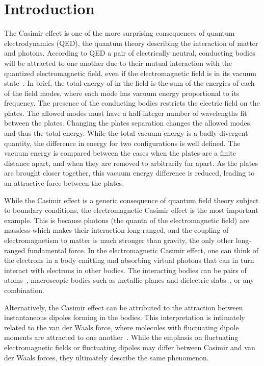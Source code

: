 \chapter{Introduction}
\label{ch:introduction}

The Casimir effect is one of the more surprising consequences of quantum electrodynamics (QED), the quantum theory
describing the interaction of matter and photons.
According to QED a pair of  electrically neutral, conducting bodies will be attracted to one another due to their mutual interaction
with the quantized electromagnetic field, even if the electromagnetic field is in its vacuum state~\cite{Casimir1948}.  
In brief, the total energy of in the field is the sum of the energies of each of the field modes, 
where each mode has vacuum energy proportional to its frequency.   
The presence of the conducting bodies restricts the electric field on the plates.
The allowed modes must have a half-integer number of wavelengths fit between the plates.  
Changing the plates separation changes the allowed modes, and thus the total energy. 
While the total vacuum energy is a badly divergent quantity, the difference in energy for two configurations
is well defined.  
The vacuum energy is compared between the cases when the plates are a finite distance apart, and when
they are removed to arbitrarily far apart.  
As the plates are brought closer together, this vacuum energy difference is reduced, leading to an attractive force
between the plates.  

While the Casimir effect is a generic consequence of quantum field theory subject to boundary conditions,
the electromagnetic Casimir effect is the most important example.  
This is because photons (the quanta of the electromagnetic field) are massless which makes their interaction long-ranged, 
and the coupling of electromagnetism to matter is much stronger than gravity, the only other long-ranged fundamental force.  
In the electromagnetic Casimir effect, one can think of the electrons in a body emitting and absorbing virtual photons that can in turn
interact with electrons in other bodies. %
The interacting bodies can be pairs of atoms~\cite{CasimirPolder1948}, 
macroscopic bodies such as metallic planes and dielectric slabs~\cite{Lifshitz1956}, or any combination.

Alternatively, the Casimir effect can be attributed to the attraction between instantaneous dipoles forming in the bodies.  
This interpretation is intimately related to the van der Waals force, where 
molecules with fluctuating dipole moments are attracted to one another~\cite{vanderWaals}.
While the emphasis on fluctuating electromagnetic fields or fluctuating dipoles may differ between Casimir and van der Waals forces,
they ultimately describe the same phenomenon.%

